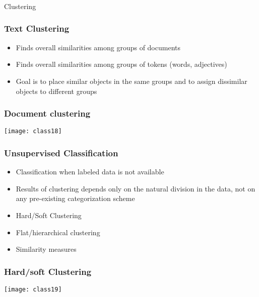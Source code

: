 \begin{frame}[fragile]\frametitle{}

\begin{center}
{\Large Clustering}
\end{center}
\end{frame}
\begin{frame}[fragile]
  \frametitle{Text Clustering}
\begin{itemize}
\item Finds overall similarities among groups of documents
\item Finds overall similarities among groups of tokens (words, adjectives)
\item Goal is to place similar objects in the same groups and to assign dissimilar objects to different groups
\end{itemize}
\end{frame}

\begin{frame}[fragile]
  \frametitle{Document clustering}
\begin{center}
\texttt{[image: class18]}
\end{center}
\end{frame}

\begin{frame}[fragile]
  \frametitle{Unsupervised Classification}
\begin{itemize}
\item Classification when labeled data is not available 
\item Results of clustering depends only on the natural division in the data, not on any pre-existing categorization scheme
\item Hard/Soft Clustering
\item Flat/hierarchical clustering

\item Similarity measures
\end{itemize}
\end{frame}

\begin{frame}[fragile]
  \frametitle{Hard/soft Clustering}
\begin{center}
\texttt{[image: class19]}
\end{center}
\end{frame}


